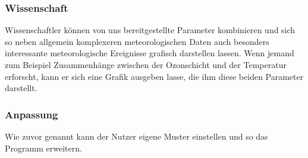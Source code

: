 \documentclass[a4paper,oneside,10pt,titlepage]{article}
\begin{document}
\subsubsection{Wissenschaft}
Wissenschaftler können von uns bereitgestellte Parameter kombinieren und sich so neben allgemein komplexeren meteorologischen Daten auch besonders interessante meteorologische Ereignisse grafisch darstellen lassen. Wenn jemand zum Beispiel Zusammenhänge zwischen der Ozonschicht und der Temperatur erforscht, kann er sich eine Grafik ausgeben lasse, die ihm diese beiden Parameter darstellt.
\subsubsection{Anpassung}
Wie zuvor genannt kann der Nutzer eigene Muster einstellen und so das Programm erweitern.
\end{document}
